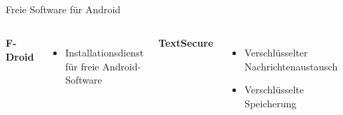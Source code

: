 \documentclass[12pt]{beamer}
\begin{document}
\subsection{}
\begin{frame}{Freie Software für Android}

\begin{columns}


\column{6cm}


\textbf{F-Droid}
\begin{itemize}
\item Installationsdienst für freie Android-Software
\end{itemize}

\vspace{0.5cm}



\textbf{TextSecure}
\begin{itemize}
\item Verschlüsselter Nachrichtenaustausch
\item Verschlüsselte Speicherung
\end{itemize}

\column{5cm}


\begin{center}
\includegraphics[width=2cm]{img/F-Droid_Logo_2}
\par\end{center}


\begin{center}
\includegraphics[width=2cm]{img/TextSecure_Icon}
\par\end{center}

\end{columns}
\end{frame}
\end{document}
